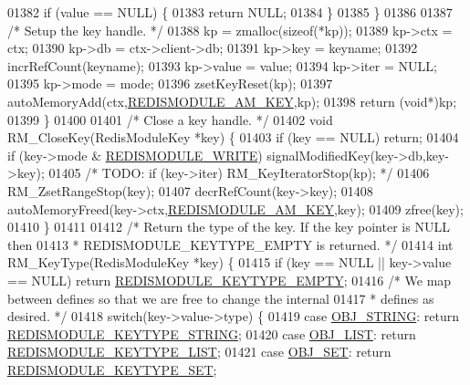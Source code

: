 \begin{DoxyCode}
{{{01382         \textcolor{keywordflow}{if} (value == NULL) \{
01383             \textcolor{keywordflow}{return} NULL;
01384         \}
01385     \}
01386 
01387     \textcolor{comment}{/* Setup the key handle. */}
01388     kp = zmalloc(\textcolor{keyword}{sizeof}(*kp));
01389     kp->ctx = ctx;
01390     kp->db = ctx->client->db;
01391     kp->key = keyname;
01392     incrRefCount(keyname);
01393     kp->value = value;
01394     kp->iter = NULL;
01395     kp->mode = mode;
01396     zsetKeyReset(kp);
01397     autoMemoryAdd(ctx,\hyperlink{module_8c_a72f72d8bccf7f1b34e5622b3571c2fe5}{REDISMODULE\_AM\_KEY},kp);
01398     \textcolor{keywordflow}{return} (\textcolor{keywordtype}{void}*)kp;
01399 \}
01400 
01401 \textcolor{comment}{/* Close a key handle. */}
01402 \textcolor{keywordtype}{void} RM\_CloseKey(RedisModuleKey *key) \{
01403     \textcolor{keywordflow}{if} (key == NULL) \textcolor{keywordflow}{return};
01404     \textcolor{keywordflow}{if} (key->mode & \hyperlink{redismodule_8h_a73b37117ef94cb4a904361afcc51b6b4}{REDISMODULE\_WRITE}) signalModifiedKey(key->db,key->key);
01405     \textcolor{comment}{/* TODO: if (key->iter) RM\_KeyIteratorStop(kp); */}
01406     RM\_ZsetRangeStop(key);
01407     decrRefCount(key->key);
01408     autoMemoryFreed(key->ctx,\hyperlink{module_8c_a72f72d8bccf7f1b34e5622b3571c2fe5}{REDISMODULE\_AM\_KEY},key);
01409     zfree(key);
01410 \}
01411 
01412 \textcolor{comment}{/* Return the type of the key. If the key pointer is NULL then}
01413 \textcolor{comment}{ * REDISMODULE\_KEYTYPE\_EMPTY is returned. */}
01414 \textcolor{keywordtype}{int} RM\_KeyType(RedisModuleKey *key) \{
01415     \textcolor{keywordflow}{if} (key == NULL || key->value ==  NULL) \textcolor{keywordflow}{return} 
      \hyperlink{redismodule_8h_adf2819748eb5e89c621d2c9c65c0b5f7}{REDISMODULE\_KEYTYPE\_EMPTY};
01416     \textcolor{comment}{/* We map between defines so that we are free to change the internal}
01417 \textcolor{comment}{     * defines as desired. */}
01418     \textcolor{keywordflow}{switch}(key->value->type) \{
01419     \textcolor{keywordflow}{case} \hyperlink{server_8h_a65236ea160f69cdef33ec942092af88f}{OBJ\_STRING}: \textcolor{keywordflow}{return} \hyperlink{redismodule_8h_aa95428eed7110a77736ddbe0584aebbf}{REDISMODULE\_KEYTYPE\_STRING};
01420     \textcolor{keywordflow}{case} \hyperlink{server_8h_a4a5f22a280949c97a0cb0d4213275126}{OBJ\_LIST}: \textcolor{keywordflow}{return} \hyperlink{redismodule_8h_a4c01058971d9d8fe1cfa02071fa87fa6}{REDISMODULE\_KEYTYPE\_LIST};
01421     \textcolor{keywordflow}{case} \hyperlink{server_8h_a8d179375a4aac33d3fa7aa80c8ccc75f}{OBJ\_SET}: \textcolor{keywordflow}{return} \hyperlink{redismodule_8h_a9dbd714eeaaf496a9b45e151a387b41a}{REDISMODULE\_KEYTYPE\_SET};
}}}
\end{DoxyCode}
